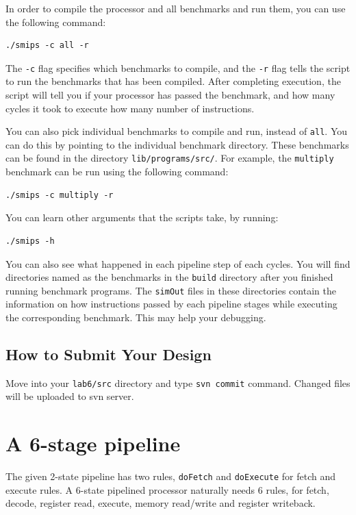 \documentclass{article}
\begin{document}
In order to compile the processor and all benchmarks and run them,
you can use the following command:

\begin{Verbatim}[frame=single]
./smips -c all -r
\end{Verbatim}

The \texttt{-c} flag specifies which benchmarks to compile, and the
\texttt{-r} flag tells the script to run the benchmarks that has been
compiled. After completing execution, the script will tell you if your
processor has passed the benchmark, and how many cycles it took to
execute how many number of instructions.

\sloppy
You can also pick individual benchmarks to compile and run, instead of
\texttt{all}. You can do this by pointing to the individual benchmark
directory. These benchmarks can be found in the directory
\texttt{lib/programs/src/}. For example, the
\texttt{multiply} benchmark can be run using the following command:

\begin{Verbatim}[frame=single]
./smips -c multiply -r
\end{Verbatim}

\sloppy
You can learn other arguments that the scripts take, by
running:

\begin{Verbatim}[frame=single]
./smips -h
\end{Verbatim}

You can also see what happened in each pipeline step of each cycles.
You will find directories named as the benchmarks in the \texttt{build} directory
after you finished running benchmark programs. The \texttt{simOut} files in these
directories contain the information on how instructions passed by each pipeline stages 
while executing the corresponding benchmark. This may help your debugging.

\subsection{How to Submit Your Design}
Move into your \texttt{lab6/src} directory and type \texttt{svn commit} command.
Changed files will be uploaded to svn server.

\section{A 6-stage pipeline}

The given 2-state pipeline has two rules, \texttt{doFetch} and
\texttt{doExecute} for fetch and execute rules. A 6-state pipelined
processor naturally needs 6 rules, for fetch, decode, register read,
execute, memory read/write and register writeback.
\end{document}
